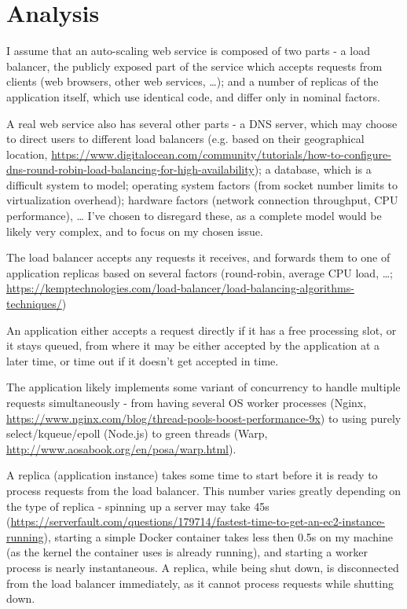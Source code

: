 \documentclass{scrartcl}
\begin{document}
\section{Analysis}
\label{sec-2}
I assume that an auto-scaling web service is composed of two parts - a load
balancer, the publicly exposed part of the service which accepts requests from
clients (web browsers, other web services, \ldots{}); and a number of replicas of the
application itself, which use identical code, and differ only in nominal
factors.

A real web service also has several other parts - a DNS server, which may choose
to direct users to different load balancers (e.g. based on their geographical
location,
\url{https://www.digitalocean.com/community/tutorials/how-to-configure-dns-round-robin-load-balancing-for-high-availability});
a database, which is a difficult system to model; operating system factors (from
socket number limits to virtualization overhead); hardware factors (network
connection throughput, CPU performance), \ldots{} I've chosen to disregard these, as
a complete model would be likely very complex, and to focus on my chosen issue.

The load balancer accepts any requests it receives, and forwards them to one of
application replicas based on several factors (round-robin, average CPU load,
\ldots{}; \url{https://kemptechnologies.com/load-balancer/load-balancing-algorithms-techniques/})

An application either accepts a request directly if it has a free processing
slot, or it stays queued, from where it may be either accepted by the
application at a later time, or time out if it doesn't get accepted in time.

The application likely implements some variant of concurrency to handle multiple
requests simultaneously - from having several OS worker processes (Nginx,
\url{https://www.nginx.com/blog/thread-pools-boost-performance-9x}) to using purely
select/kqueue/epoll (Node.js) to green threads (Warp,
\url{http://www.aosabook.org/en/posa/warp.html}).

A replica (application instance) takes some time to start before it is ready to
process requests from the load balancer. This number varies greatly depending on
the type of replica - spinning up a server may take 45s
(\url{https://serverfault.com/questions/179714/fastest-time-to-get-an-ec2-instance-running}),
starting a simple Docker container takes less then 0.5s on my machine (as the
kernel the container uses is already running), and starting a worker process is
nearly instantaneous. A replica, while being shut down, is disconnected from the
load balancer immediately, as it cannot process requests while shutting down.
\end{document}
